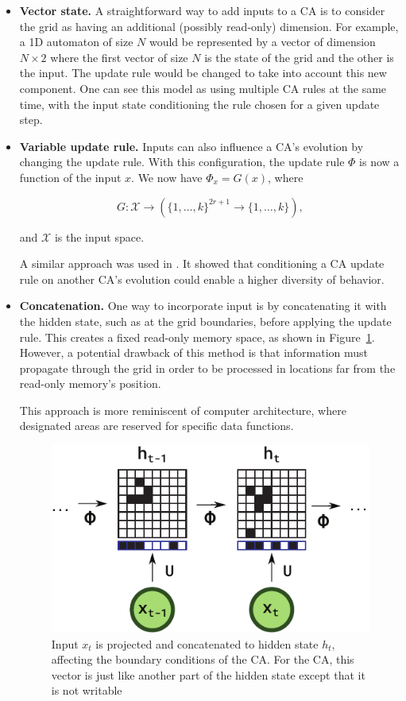 \begin{itemize}
  \item \textbf{Vector state.} A straightforward way to add inputs to a \ac{CA} is to
        consider the grid as having an additional (possibly read-only)
        dimension. For example, a 1D automaton of size $N$ would be represented by
        a vector of dimension $N\times 2$ where the first vector of size $N$ is the
        state of the grid and the other is the input. The update rule would be
        changed to take into account this new component. One can see this model
        as using multiple \ac{CA} rules at the same time, with the input state
        conditioning the rule chosen for a given update step.

  \item \textbf{Variable update rule.} Inputs can also influence a CA's evolution by
        changing the update rule. With this configuration, the update rule $\Phi$
        is now a function of the input $x$. We now have $\Phi_x = G(x)$, where

            \[G: \mathcal{X} \rightarrow \left({\{ 1, \ldots, k \}}^{2r+1} \to \{1, \ldots, k\}\right),\]

        and $\mathcal{X}$ is the input space.
        
        A similar approach was used in
        \parencite{adamsFormalDefinitionsUnbounded2017}. It showed that
        conditioning a CA update rule on another CA's evolution could enable a
        higher diversity of behavior.

  \item \textbf{Concatenation.} One way to incorporate input is by concatenating 
  it with the hidden state, such as at the grid boundaries, before applying the
  update rule. This creates a fixed read-only memory space, as shown in 
  Figure~\ref{fig:concat}. However, a potential drawback of this method is that 
  information must propagate through the grid in order to be processed in locations 
  far from the read-only memory's position. 
        
        This approach is more reminiscent of computer architecture, where designated 
        areas are reserved for specific data functions.

\begin{figure}[ht]
  \centering \includegraphics[width=.5\linewidth]{figures/concat.pdf}
  \caption{\label{fig:concat} Input $x_t$ is projected and concatenated to
    hidden state $h_t$, affecting the boundary conditions of the 
    \ac{CA}. For the \ac{CA}, this vector is just like another part of the
    hidden state except that it is not writable}
\end{figure}
\end{itemize}



